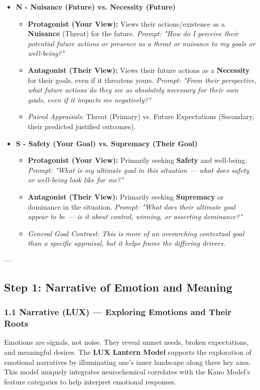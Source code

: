 \documentclass{article}
\begin{document}
\begin{itemize}[noitemsep,topsep=0pt]
    \item \textbf{N - Nuisance (Future) vs. Necessity (Future)}
    \begin{itemize}[noitemsep,topsep=0pt]
        \item \textbf{Protagonist (Your View):} Views their actions/existence as a \textbf{Nuisance} (Threat) for the future. \textit{Prompt: "How do I perceive their potential future actions or presence as a threat or nuisance to my goals or well-being?"}
        \item \textbf{Antagonist (Their View):} Views their future actions as a \textbf{Necessity} for their goals, even if it threatens yours. \textit{Prompt: "From their perspective, what future actions do they see as absolutely necessary for their own goals, even if it impacts me negatively?"}
        \item \textit{Paired Appraisals:} Threat (Primary) vs. Future Expectations (Secondary, their predicted justified outcomes).
    \end{itemize}

    \item \textbf{S - Safety (Your Goal) vs. Supremacy (Their Goal)}
    \begin{itemize}[noitemsep,topsep=0pt]
        \item \textbf{Protagonist (Your View):} Primarily seeking \textbf{Safety} and well-being. \textit{Prompt: "What is my ultimate goal in this situation — what does safety or well-being look like for me?"}
        \item \textbf{Antagonist (Their View):} Primarily seeking \textbf{Supremacy} or dominance in the situation. \textit{Prompt: "What does their ultimate goal appear to be — is it about control, winning, or asserting dominance?"}
        \item \textit{General Goal Contrast: This is more of an overarching contextual goal than a specific appraisal, but it helps frame the differing drivers.}
    \end{itemize}
\end{itemize}

---

\subsection{Step 1: Narrative of Emotion and Meaning}

\subsubsection{1.1 Narrative (LUX) — Exploring Emotions and Their Roots}
Emotions are signals, not noise. They reveal unmet needs, broken expectations, and meaningful desires.  
The \textbf{LUX Lantern Model} supports the exploration of emotional narratives by illuminating one’s inner landscape along three key axes.  
This model uniquely integrates neurochemical correlates with the Kano Model’s feature categories to help interpret emotional responses.
\end{document}
